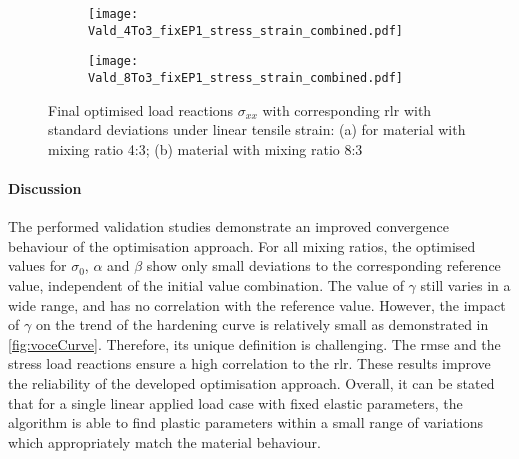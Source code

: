 \begin{figure}[H]
\centering

\begin{subfigure}[t]{0.495\textwidth}
    \centering
    \texttt{[image: Vald\_4To3\_fixEP1\_stress\_strain\_combined.pdf]}
    \caption{}
    \label{fig:validStressStrain4to3}
\end{subfigure}
\hfill
\begin{subfigure}[t]{0.495\textwidth}
    \centering
    \texttt{[image: Vald\_8To3\_fixEP1\_stress\_strain\_combined.pdf]}
    \caption{}
    \label{fig:validStressStrain8to3}
\end{subfigure}
\caption{Final optimised load reactions $\sigma_{xx}$ with corresponding \acrfull{rlr} with standard deviations under linear tensile strain: (a) for material with mixing ratio 4:3; (b) material with mixing ratio 8:3}
\label{fig:validStressStrain4and8}
\end{figure}


\paragraph{Discussion}
The performed validation studies demonstrate an improved convergence behaviour of the optimisation approach. For all mixing ratios, the optimised values for $\sigma_0$, $\alpha$ and $\beta$ show only small deviations to the corresponding  reference value, independent of the initial value combination. The value of $\gamma$ still varies in a wide range, and has no correlation with the reference value. However, the impact of $\gamma$ on the trend of the hardening curve is relatively small as demonstrated in \autoref{fig:voceCurve}. Therefore, its unique definition is challenging. The \acrshort{rmse} and the stress load reactions ensure a high correlation to the \acrlong{rlr}. These results improve the reliability of the developed optimisation approach. Overall, it can be stated that for a single linear applied load case with fixed elastic parameters, the algorithm is able to find plastic parameters within a small range of variations which appropriately match the material behaviour.



